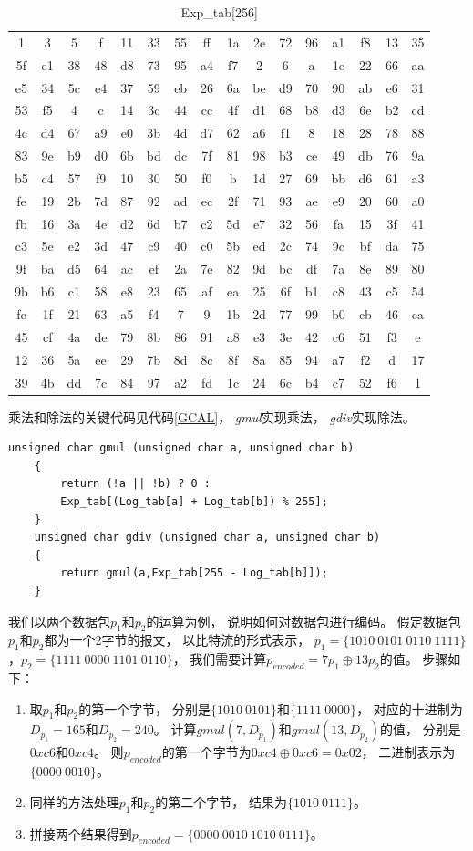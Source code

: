 \begin{table}[htb]
	\caption{Exp\_tab[256]}
	\centering
	\begin{tabular}{cccccccccccccccc}
		\toprule
 1& 3& 5& f&11&33&55&ff&1a&2e&72&96&a1&f8&13&35\\
5f&e1&38&48&d8&73&95&a4&f7& 2& 6& a&1e&22&66&aa\\
e5&34&5c&e4&37&59&eb&26&6a&be&d9&70&90&ab&e6&31\\
53&f5& 4& c&14&3c&44&cc&4f&d1&68&b8&d3&6e&b2&cd\\
4c&d4&67&a9&e0&3b&4d&d7&62&a6&f1& 8&18&28&78&88\\
83&9e&b9&d0&6b&bd&dc&7f&81&98&b3&ce&49&db&76&9a\\
b5&c4&57&f9&10&30&50&f0& b&1d&27&69&bb&d6&61&a3\\
fe&19&2b&7d&87&92&ad&ec&2f&71&93&ae&e9&20&60&a0\\
fb&16&3a&4e&d2&6d&b7&c2&5d&e7&32&56&fa&15&3f&41\\
c3&5e&e2&3d&47&c9&40&c0&5b&ed&2c&74&9c&bf&da&75\\
9f&ba&d5&64&ac&ef&2a&7e&82&9d&bc&df&7a&8e&89&80\\
9b&b6&c1&58&e8&23&65&af&ea&25&6f&b1&c8&43&c5&54\\
fc&1f&21&63&a5&f4& 7& 9&1b&2d&77&99&b0&cb&46&ca\\
45&cf&4a&de&79&8b&86&91&a8&e3&3e&42&c6&51&f3& e\\
12&36&5a&ee&29&7b&8d&8c&8f&8a&85&94&a7&f2& d&17\\
39&4b&dd&7c&84&97&a2&fd&1c&24&6c&b4&c7&52&f6& 1\\
		\bottomrule
	\end{tabular}
	\label{Exptab}
\end{table}
乘法和除法的关键代码见代码\ref{GCAL}，
\emph{gmul}实现乘法，
\emph{gdiv}实现除法。
	\begin{lstlisting}[float,caption=gmul和gdiv实现,label={GCAL},language={[ANSI]C}]
	unsigned char gmul (unsigned char a, unsigned char b)
	{
		return (!a || !b) ? 0 : 
		Exp_tab[(Log_tab[a] + Log_tab[b]) % 255];
	}
	unsigned char gdiv (unsigned char a, unsigned char b)
	{
		return gmul(a,Exp_tab[255 - Log_tab[b]]);
	}
	\end{lstlisting}

\par
我们以两个数据包$p_{1}$和$p_{2}$的运算为例，
说明如何对数据包进行编码。
假定数据包$p_{1}$和$p_{2}$都为一个2字节的报文，
以比特流的形式表示，
$p_{1}=\{1010\ 0101\ 0110\ 1111\}$，$p_{2}=\{1111\ 0000\ 1101\ 0110\}$，
我们需要计算$p_{encoded}=7p_{1} \oplus 13p_{2}$的值。
步骤如下：
\begin{enumerate}[fullwidth,itemindent=2em,label=(\arabic*)]
	\item 取$p_{1}$和$p_{2}$的第一个字节，
	分别是$\{1010\ 0101\}$和$\{1111\ 0000\}$，
	对应的十进制为$D_{p_1}=165$和$D_{p_2}=240$。
	计算$gmul\left(7,D_{p_1}\right)$和$gmul\left(13,D_{p_2}\right)$的值，
	分别是$0xc6$和$0xc4$。
	则$p_{encoded}$的第一个字节为$0xc4 \oplus 0xc6=0x02$，
	二进制表示为$\{0000\ 0010\}$。
	\item 同样的方法处理$p_{1}$和$p_{2}$的第二个字节，
	结果为$\{1010\ 0111\}$。
	\item 拼接两个结果得到$p_{encoded}=\{0000\ 0010\ 1010\ 0111\}$。
\end{enumerate}
